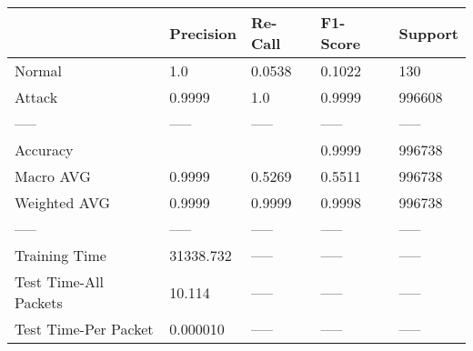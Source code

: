 \begin{tabular}{lllll}
\toprule
{} &  Precision & Re-Call & F1-Score & Support \\
\midrule
Normal                &        1.0 &  0.0538 &   0.1022 &     130 \\
Attack                &     0.9999 &     1.0 &   0.9999 &  996608 \\
-----                 &      ----- &   ----- &    ----- &   ----- \\
Accuracy              &            &         &   0.9999 &  996738 \\
Macro AVG             &     0.9999 &  0.5269 &   0.5511 &  996738 \\
Weighted AVG          &     0.9999 &  0.9999 &   0.9998 &  996738 \\
-----                 &      ----- &   ----- &    ----- &   ----- \\
Training Time         &  31338.732 &   ----- &    ----- &   ----- \\
Test Time-All Packets &     10.114 &   ----- &    ----- &   ----- \\
Test Time-Per Packet  &   0.000010 &   ----- &    ----- &   ----- \\
\bottomrule
\end{tabular}
